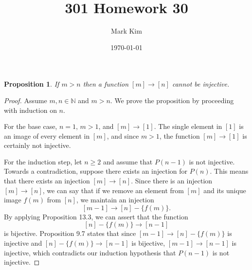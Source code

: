 \documentclass[12pt]{amsart}
\title{301 Homework 30}
\author{Mark Kim}
\date{\today}
\newcommand{\N}{\mathbb{N}}
\newtheorem*{proposition}{Proposition}
\begin{document}
\maketitle

\begin{proposition}
If $m>n$ then a function $[m]\rightarrow [n]$ cannot be injective.
\end{proposition}

\begin{proof}
Assume $m,n\in\N$ and $m>n$. We prove the proposition by proceeding with induction on $n$.

For the base case, $n=1$, $m>1$, and $[m]\rightarrow [1]$.  The single element in $[1]$ is an image of every element in $[m]$, and since $m>1$, the function $[m]\rightarrow [1]$ is certainly not injective.

For the induction step, let $n\geq 2$ and assume that $P(n-1)$ is not injective.  Towards a contradiction, suppose there exists an injection for $P(n)$.  This means that there exists an injection $[m]\rightarrow[n]$.  Since there is an injection $[m]\rightarrow[n]$, we can say that if we remove an element from $[m]$ and its unique image $f(m)$ from $[n]$, we maintain an injection
\[
[m-1]\rightarrow[n]-\{f(m)\}.
\]
By applying Proposition 13.3, we can assert that the function
\[
[n]-\{f(m)\}\rightarrow[n-1]
\]
is bijective.  Proposition 9.7 states that since $[m-1]\rightarrow[n]-\{f(m)\}$ is injective and $[n]-\{f(m)\}\rightarrow[n-1]$ is bijective, $[m-1]\rightarrow[n-1]$ is injective, which contradicts our induction hypothesis that $P(n-1)$ is not injective.
\end{proof}
\end{document}
